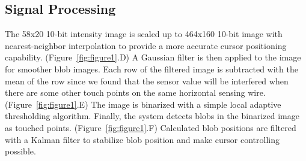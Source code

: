 


\subsection{Signal Processing}

The 58x20 10-bit intensity image is scaled up to 464x160 10-bit image with nearest-neighbor interpolation to provide a more accurate cursor positioning capability. (Figure~\ref{fig:figure1}.D)
A Gaussian filter is then applied to the image for smoother blob images.
Each row of the filtered image is subtracted with the mean of the row since we found that the sensor value will be interfered when there are some other touch points on the same horizontal sensing wire.(Figure~\ref{fig:figure1}.E)
The image is binarized with a simple local adaptive thresholding algorithm.
Finally, the system detects blobs in the binarized image as touched points. (Figure~\ref{fig:figure1}.F)
Calculated blob positions are filtered with a Kalman filter to stabilize blob position and make cursor controlling possible.


